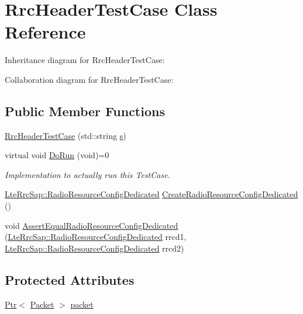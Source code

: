 \hypertarget{classRrcHeaderTestCase}{}\section{Rrc\+Header\+Test\+Case Class Reference}
\label{classRrcHeaderTestCase}


Inheritance diagram for Rrc\+Header\+Test\+Case\+:


Collaboration diagram for Rrc\+Header\+Test\+Case\+:
\subsection*{Public Member Functions}
\begin{DoxyCompactItemize}
\item 
\hyperlink{classRrcHeaderTestCase_a59d334d21492c281b877a73bb0ac2a03}{Rrc\+Header\+Test\+Case} (std\+::string \hyperlink{generate__test__data__lte__sinr_8m_ad83eeb3a142285d1243a08c6b7026df8}{s})
\item 
virtual void \hyperlink{classRrcHeaderTestCase_ab72ac5cd07c4359237c8e36ab16f5414}{Do\+Run} (void)=0
\begin{DoxyCompactList}\small\item\em Implementation to actually run this Test\+Case. \end{DoxyCompactList}\item 
\hyperlink{structns3_1_1LteRrcSap_1_1RadioResourceConfigDedicated}{Lte\+Rrc\+Sap\+::\+Radio\+Resource\+Config\+Dedicated} \hyperlink{classRrcHeaderTestCase_a078175e25caaedb4ef308b54e76db7b4}{Create\+Radio\+Resource\+Config\+Dedicated} ()
\item 
void \hyperlink{classRrcHeaderTestCase_ab6230c6987acd58d7482ca5e40b80875}{Assert\+Equal\+Radio\+Resource\+Config\+Dedicated} (\hyperlink{structns3_1_1LteRrcSap_1_1RadioResourceConfigDedicated}{Lte\+Rrc\+Sap\+::\+Radio\+Resource\+Config\+Dedicated} rrcd1, \hyperlink{structns3_1_1LteRrcSap_1_1RadioResourceConfigDedicated}{Lte\+Rrc\+Sap\+::\+Radio\+Resource\+Config\+Dedicated} rrcd2)
\end{DoxyCompactItemize}
\subsection*{Protected Attributes}
\begin{DoxyCompactItemize}
\item 
\hyperlink{classns3_1_1Ptr}{Ptr}$<$ \hyperlink{classns3_1_1Packet}{Packet} $>$ \hyperlink{classRrcHeaderTestCase_a6f0748c0e845f797497fbda1ca781803}{packet}
\end{DoxyCompactItemize}
